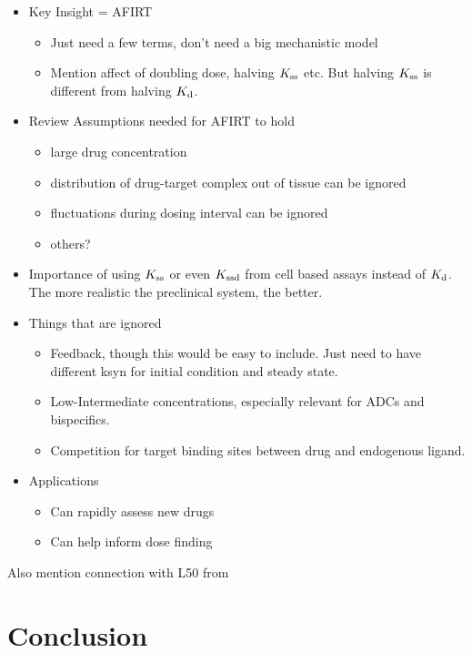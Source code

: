 \begin{itemize}
\item Key Insight = AFIRT
	\begin{itemize}
		\item Just need a few terms, don't need a big mechanistic model
		\item Mention affect of doubling dose, halving $K_\text{ss}$ etc.
			\subitem But halving $K_\text{ss}$ is different from halving $K_\text{d}$.
	\end{itemize}
\item Review Assumptions needed for AFIRT to hold
	\begin{itemize}
		\item large drug concentration
		\item distribution of drug-target complex out of tissue can be ignored
		\item fluctuations during dosing interval can be ignored
		\item others?
	\end{itemize}
\item Importance of using $K_\text{ss}$ or even $K_\text{ssd}$ from cell based assays instead of $K_\text{d}$.  The more realistic the preclinical system, the better.
\item Things that are ignored
	\begin{itemize}
		\item Feedback, though this would be easy to include.  Just need to have different ksyn for initial condition and steady state.
		\item Low-Intermediate concentrations, especially relevant for ADCs and bispecifics.
		\item Competition for target binding sites between drug and endogenous ligand.
	\end{itemize}
\item Applications
	\begin{itemize}
		\item Can rapidly assess new drugs
		\item Can help inform dose finding
	\end{itemize}
\end{itemize}

Also mention connection with L50 from \cite{gabrielsson17}

\section{Conclusion}